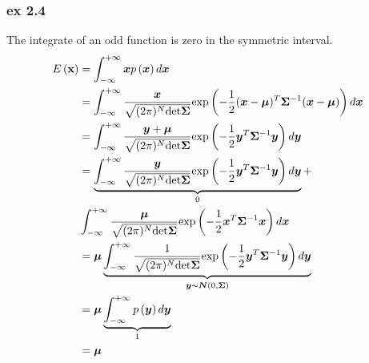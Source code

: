 \documentclass[10pt]{article}
\begin{document}
\subsubsection{ex 2.4}
The integrate of an odd function is zero in the symmetric interval.
\begin{equation}
	\begin{split}
		E\left(\mathbf{x} \right) &= \int_{-\infty}^{+\infty}\boldsymbol{x}p\left(\boldsymbol{x}\right)d\boldsymbol{x} \hfill \\
		&= \int_{-\infty}^{+\infty}\frac{\boldsymbol{x}}{\sqrt{(2\pi)^N\text{det}\boldsymbol{\Sigma}}}\text{exp}\left(-\frac{1}{2}(\boldsymbol{x}-\boldsymbol{\mu})^T\boldsymbol{\Sigma}^{-1}(\boldsymbol{x}-\boldsymbol{\mu})\right)d\boldsymbol{x} \hfill \\  
		&=  
		\int_{-\infty}^{+\infty}\frac{\boldsymbol{y}+\boldsymbol{\mu}}{\sqrt{(2\pi)^N\text{det}\boldsymbol{\Sigma}}}\text{exp}\left(-\frac{1}{2}\boldsymbol{y}^T\boldsymbol{\Sigma}^{-1}\boldsymbol{y}\right)d\boldsymbol{y} \hfill \\
		&=
		\underbrace{\int_{-\infty}^{+\infty}\frac{\boldsymbol{y}}{\sqrt{(2\pi)^N\text{det}\boldsymbol{\Sigma}}}\text{exp}\left(-\frac{1}{2}\boldsymbol{y}^T\boldsymbol{\Sigma}^{-1}\boldsymbol{y}\right)d\boldsymbol{y}}_{0} +\hfill
		\\& \int_{-\infty}^{+\infty}\frac{\boldsymbol{\mu}}{\sqrt{(2\pi)^N\text{det}\boldsymbol{\Sigma}}}\text{exp}\left(-\frac{1}{2}\boldsymbol{x}^T\boldsymbol{\Sigma}^{-1}\boldsymbol{x}\right)d\boldsymbol{x} \hfill
		\\&=
		\boldsymbol{\mu}\underbrace{\int_{-\infty}^{+\infty}\frac{1}{\sqrt{(2\pi)^N\text{det}\boldsymbol{\Sigma}}}\text{exp}\left(-\frac{1}{2}\boldsymbol{y}^T\boldsymbol{\Sigma}^{-1}\boldsymbol{y}\right)d\boldsymbol{y}}_{\boldsymbol{y}\sim\boldsymbol{N}(0,\boldsymbol{\Sigma})} \hfill
		\\&=
		\boldsymbol{\mu}\underbrace{\int_{-\infty}^{+\infty}p\left(\boldsymbol{y}\right)d\boldsymbol{y}}_{1} \hfill
		\\&=   \boldsymbol{\mu}
	\end{split}
\end{equation}
\end{document}
